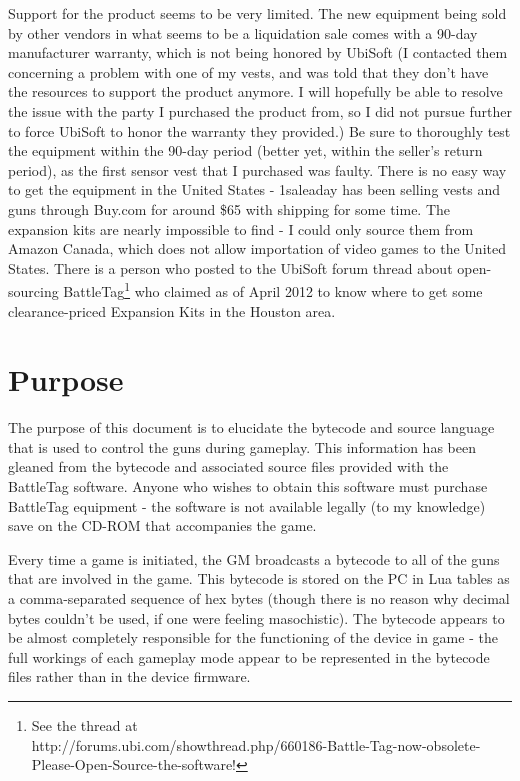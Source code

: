 \documentclass[12pt,a4paper]{scrbook}
\begin{document}
Support for the product seems to be very limited.  The new equipment being sold by other
vendors in what seems to be a liquidation sale comes with a 90-day manufacturer warranty, 
which is not being honored by UbiSoft (I contacted them concerning a problem with one of my vests, 
and was told that they don't have the resources to support the product anymore.  I will hopefully be
able to resolve the issue with the party I purchased the product from, so I did not pursue further to
force UbiSoft to honor the warranty they provided.)  Be sure to thoroughly test the
equipment within the 90-day period (better yet, within the seller's return period), as the first
 sensor vest that I purchased was faulty.
There is no easy way to get the equipment in the United States - 1saleaday has been selling
vests and guns through Buy.com  for around \$65 with shipping for some time.  The expansion kits are
 nearly impossible to find - I could only source them from Amazon Canada, which does not allow 
 importation of video games to the United States.  There is a person who posted to the UbiSoft forum
 thread about open-sourcing BattleTag\footnote{See the thread at \\
 http://forums.ubi.com/showthread.php/660186-Battle-Tag-now-obsolete-Please-Open-Source-the-software!}
who claimed as of April 2012 to know where to get some clearance-priced Expansion Kits in the
Houston area.

\section*{Purpose}

The purpose of this document is to elucidate the bytecode and source language that is used to 
control the 
guns during gameplay.  This information has been gleaned from the bytecode and associated
source files provided with the BattleTag software.  Anyone who wishes to obtain this 
software must purchase BattleTag equipment - the software is not available legally (to
my knowledge) save on the CD-ROM that accompanies the game.

Every time a game is initiated, the GM broadcasts a bytecode
to all of the guns that are involved in the game.  This bytecode is stored on the PC in Lua tables
as a comma-separated sequence of hex bytes (though there is no reason why decimal bytes
couldn't be used, if one were feeling masochistic).  The bytecode appears to be almost completely
responsible for the functioning of the device in game - the full workings of each gameplay
mode appear to be represented in the bytecode files rather than in the device firmware.
\end{document}
